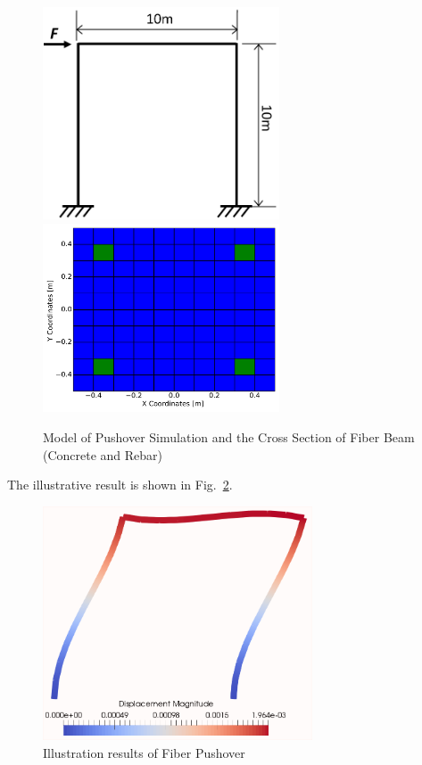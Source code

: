 \begin{figure}[H]
  \centering
  \includegraphics[width = 7cm]{./Figure-files/Day3/Frame_Pushover/overview.pdf}
  \includegraphics[width = 7cm]{./Figure-files/Day3/Frame_Pushover/rectangle_rebar2.pdf}
  \caption{Model of Pushover Simulation and the Cross Section of Fiber Beam (Concrete and Rebar) }
  \label{fig_frame_pushover}
\end{figure}

The illustrative result is shown in Fig.~\ref{fig_day3_fiberbeam_pushover_results}.

\begin{figure}[H]
  \centering
  \includegraphics[width = 8cm]{./Figure-files/Day3/Frame_Pushover/fiberBeamDeform.png}
  \caption{Illustration results of Fiber Pushover}
  \label{fig_day3_fiberbeam_pushover_results}
\end{figure}







